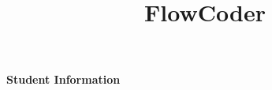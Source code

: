 \def\thesistitle{FlowCoder}
\def\thesissubtitle{A Model of Symbolic Thought Composition via Program Synthesis using Generative Flow}


\title{\thesistitle}
\date{\thesisdate}


%     

	








    
    \vspace{3cm}
    \textbf{Student Information} \\

